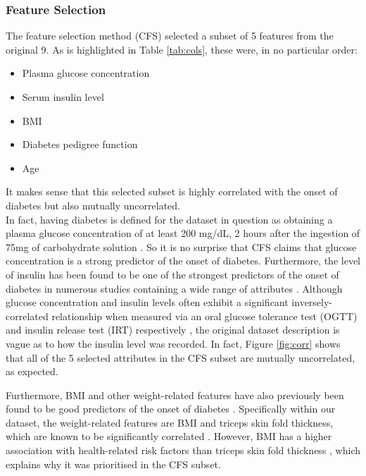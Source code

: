\subsubsection{Feature Selection}


The feature selection method (CFS) selected a subset of 5 features from the original 9. As is highlighted in Table \ref{tab:cols}, these were, in no particular order:

\begin{itemize}
    \item Plasma glucose concentration
    \item Serum insulin level
    \item BMI
    \item Diabetes pedigree function
    \item Age
\end{itemize}

It makes sense that this selected subset is highly correlated with the onset of diabetes but also mutually uncorrelated. \\

In fact, having diabetes is defined for the dataset in question as obtaining a plasma glucose concentration of at least 200 mg/dL, 2 hours after the ingestion of 75mg of carbohydrate solution \cite{pima}. So it is no surprise that CFS claims that glucose concentration is a strong predictor of the onset of diabetes. Furthermore, the level of insulin has been found to be one of the strongest predictors of the onset of diabetes in numerous studies containing a wide range of attributes \cite{a,b,c,d}. Although glucose concentration and insulin levels often exhibit a significant inversely-correlated relationship when measured via an oral glucose tolerance test (OGTT) and insulin release test (IRT) respectively \cite{e}, the original dataset description is vague as to how the insulin level was recorded. In fact, Figure \ref{fig:corr} shows that all of the 5 selected attributes in the CFS subset are mutually uncorrelated, as expected.

Furthermore, BMI and other weight-related features have also previously been found to be good predictors of the onset of diabetes \cite{a,c,d}. Specifically within our dataset, the weight-related features are BMI and triceps skin fold thickness, which are known to be significantly correlated \cite{f}. However, BMI has a higher association with health-related risk factors than triceps skin fold thickness \cite{g,h}, which explains why it was prioritised in the CFS subset.

